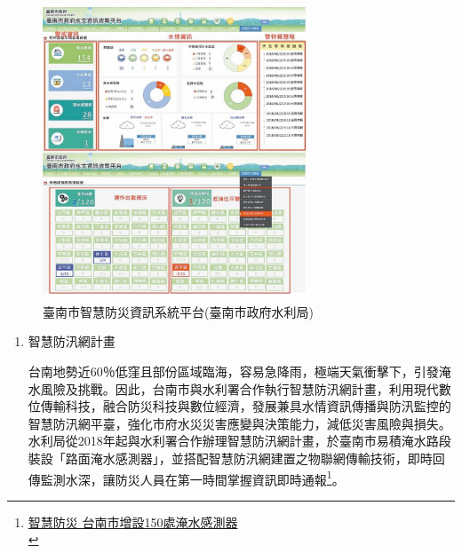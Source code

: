 \documentclass[a4paper,12pt]{article}
\begin{document}
\begin{enumerate}
\begin{figure}[htbp]
\centering
\includegraphics[width=300]{images/161637280435514_P7767413.jpg}
\caption{\label{fig:FigName}臺南市智慧防災資訊系統平台(臺南市政府水利局)}
\end{figure}
\begin{enumerate}
\item 智慧防汛網計畫
\label{sec:org12d113a}

台南地勢近60％低窪且部份區域臨海，容易急降雨，極端天氣衝擊下，引發淹水風險及挑戰。因此，台南市與水利署合作執行智慧防汛網計畫，利用現代數位傳輸科技，融合防災科技與數位經濟，發展兼具水情資訊傳播與防汛監控的智慧防汛網平臺，強化市府水災災害應變與決策能力，減低災害風險與損失。水利局從2018年起與水利署合作辦理智慧防汛網計畫，於臺南市易積淹水路段裝設「路面淹水感測器」，並搭配智慧防汛網建置之物聯網傳輸技術，即時回傳監測水深，讓防災人員在第一時間掌握資訊即時通報\footnote{\href{https://www.chinatimes.com/realtimenews/20201204005753-260421?chdtv}{智慧防災 台南市增設150處淹水感測器}\\\label{org06ca4c3}}。\\


\end{enumerate}
\end{enumerate}
\end{document}
